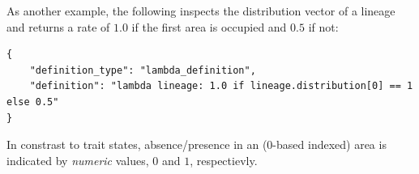 \documentclass[11pt,openany]{memoir} %
\begin{document}
As another example, the following inspects the distribution vector of a lineage and returns a rate of $1.0$ if the first area is occupied and $0.5$ if not:
\begin{lstlisting}
{
    "definition_type": "lambda_definition",
    "definition": "lambda lineage: 1.0 if lineage.distribution[0] == 1 else 0.5"
}
\end{lstlisting}
In constrast to trait states, absence/presence in an (0-based indexed) area is indicated by \textit{numeric} values, $0$ and $1$, respectievly.
\end{document}
